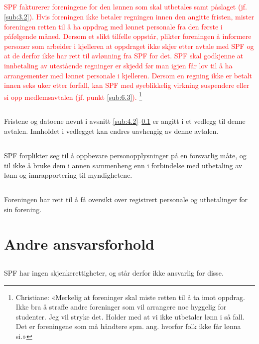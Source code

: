 \documentclass[12pt]{article}
\begin{document}
\subsection{}
\label{sub:4.4}
\textcolor{red}{SPF fakturerer foreningene for den lønnen
som skal utbetales samt påslaget
(jf. \ref{sub:3.2}).
Hvis foreningen ikke betaler regningen
innen den angitte fristen, mister
foreningen retten til å ha oppdrag med
lønnet personale fra den første i
påfølgende måned.
Dersom et slikt tilfelle oppstår,
plikter foreningen å 
informere personer som arbeider i kjelleren
at oppdraget ikke skjer etter avtale med
SPF og at de derfor ikke har rett til
avlønning fra SPF for det.
SPF skal godkjenne at innbetaling av
utestående regninger er skjedd før man
igjen får lov til å ha arrangementer
med lønnet personale i kjelleren.
Dersom en regning ikke er betalt innen
seks uker etter forfall, kan SPF
med øyeblikkelig virkning suspendere
eller si opp medlemsavtalen (jf.
punkt \ref{sub:6.3}).}
\footnote{Christiane: «Merkelig at foreninger skal miste retten til å ta imot oppdrag. 
Ikke bra å straffe andre foreninger som vil arrangere noe hyggelig for studenter. Jeg vil 
stryke det. Holder med at vi ikke utbetaler lønn i så fall. Det er foreningene som må 
håndtere spm. ang. hvorfor folk ikke får lønna si.»}
\subsection{}
\label{sub:4.5}
Fristene og datoene nevnt i avsnitt
\ref{sub:4.2}--\ref{sub:4.4} er angitt
i et vedlegg til denne avtalen.
Innholdet i vedlegget kan endres
uavhengig av denne avtalen.
\subsection{}
\label{sub:4.6}
SPF forplikter seg til å oppbevare
personopplysninger på en forsvarlig måte,
og til ikke å bruke dem i annen
sammenheng enn i forbindelse med utbetaling
av lønn og innrapportering til
myndighetene.
\subsection{}
\label{sub:4.7}
Foreningen har rett til å få oversikt
over registrert personale
og utbetalinger for sin forening.
\section{Andre ansvarsforhold}
\label{sec:5}
\subsection{}
\label{sub:5.1}
SPF har ingen skjenkerettigheter,
og står derfor ikke ansvarlig for disse.
\end{document}

